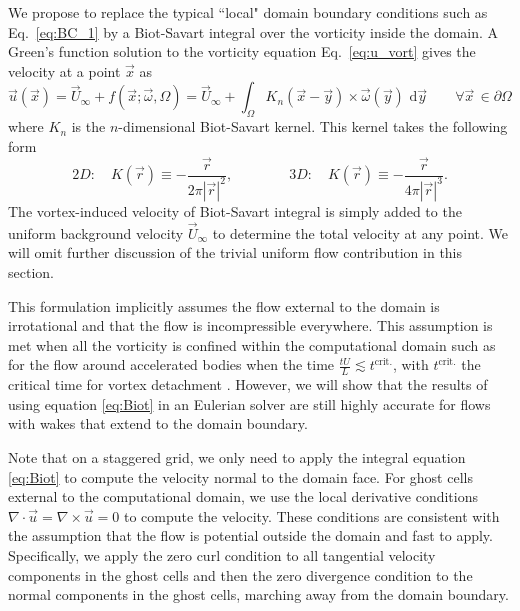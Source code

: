 \documentclass[final,1p,times]{elsarticle}
\begin{document}
We propose to replace the typical ``local" domain boundary conditions such as Eq.~\eqref{eq:BC_1} by a Biot-Savart integral over the vorticity inside the domain. A Green's function solution to the vorticity equation Eq.~\eqref{eq:u_vort} gives the velocity at a point $\vec x$ as
\begin{equation}\label{eq:Biot}
    {\vec u}({\vec x}) = \vec U_\infty+f(\vec x; \vec\omega,\Omega) = \vec U_\infty+\int_\Omega K_{n}({\vec x} - \vec{y})\times \vec\omega({\vec y})\text{ d}\vec{y} \quad\quad \forall \vec x\, \in \partial\Omega
\end{equation}
where $K_n$ is the $n$-dimensional Biot-Savart kernel. This kernel takes the following form \cite{Eldredge2019MathematicalFlows}
\begin{equation}\label{eq:kernels}
    2D:\quad K(\vec r)\equiv -\frac{\vec{r}}{2\pi|\vec{r}|^2}, \qquad\qquad 3D:\quad K(\vec r)\equiv -\frac{\vec{r}}{4\pi|\vec{r}|^3}.
\end{equation}
The vortex-induced velocity of Biot-Savart integral is simply added to the uniform background velocity $\vec U_\infty$ to determine the total velocity at any point. We will omit further discussion of the trivial uniform flow contribution in this section.

This formulation implicitly assumes the flow external to the domain is irrotational and that the flow is incompressible everywhere. This assumption is met when all the vorticity is confined within the computational domain such as for the flow around accelerated bodies when the time $\frac{tU}{L}\lesssim t^{\text{crit.}}$, with $t^{\text{crit.}}$ the critical time for vortex detachment \cite{Shusser2000EnergyRing}. However, we will show that the results of using equation \eqref{eq:Biot} in an Eulerian solver are still highly accurate for flows with wakes that extend to the domain boundary. 

Note that on a staggered grid, we only need to apply the integral equation \eqref{eq:Biot} to compute the velocity normal to the domain face. For ghost cells external to the computational domain, we use the local derivative conditions $\nabla\cdot\vec{u} = \nabla\times\vec{u}=0$ to compute the velocity. These conditions are consistent with the assumption that the flow is potential outside the domain and fast to apply. Specifically, we apply the zero curl condition to all tangential velocity components in the ghost cells and then the zero divergence condition to the normal components in the ghost cells, marching away from the domain boundary.
\end{document}
